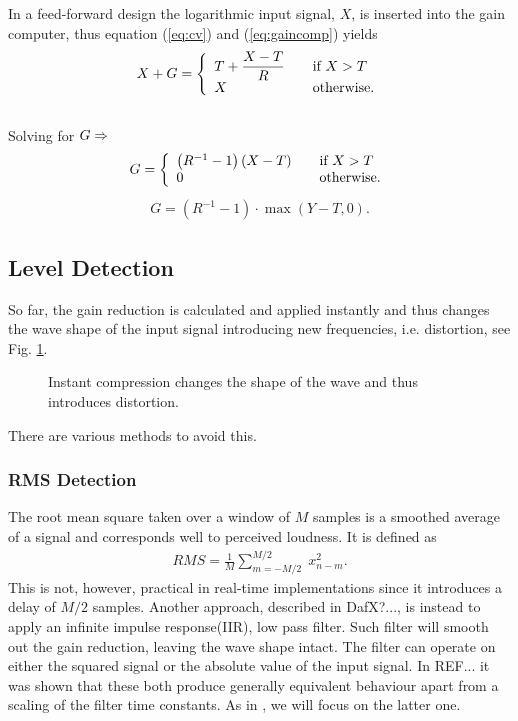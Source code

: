 \documentclass[../main2.tex]{subfiles}
\begin{document}
In a feed-forward design the logarithmic input signal, $X$,  is inserted into the gain computer, thus equation (\ref{eq:cv}) and (\ref{eq:gaincomp}) yields
\begin{equation}
X+G = \left\{ 
  \begin{array}{l l}
    T+ \dfrac{X-T}{R} & \quad \text{if $X > T$}\\
    X & \quad \text{otherwise.}
  \end{array} \right.
\end{equation}
\\Solving for $G \rm \Rightarrow$
\begin{equation} \label{eq:c}
G = \left\{ 
  \begin{array}{l l}
    \left(R^{-1}-1\right)(X-T)& \quad \text{if $X > T$}\\
    0 & \quad \text{otherwise.}
  \end{array} \right.
\end{equation}
\begin{align}
G = (R^{-1}-1)\cdot \max\left(Y-T,0\right).
\end{align}

\subsection{Level Detection}
So far, the gain reduction is calculated and applied instantly and thus changes the wave shape of the input signal introducing new frequencies, i.e. distortion, see Fig. \ref{fig:instant_comp}. 
\begin{figure}[ht]
\centering

\caption{Instant compression changes the shape of the wave and thus introduces distortion.} 
\label{fig:instant_comp}
\end{figure}
There are various methods to avoid this.
\subsubsection{RMS Detection}
The root mean square taken over a window of $M$ samples is a smoothed average of a signal and corresponds well to perceived loudness\cite{giannoullis}. It is defined as 
\begin{align}
RMS = \frac{1}{M}\sum_{m=-M/2}^{M/2}\;x_{n-m}^2.
\end{align}
This is not, however, practical in real-time implementations since it introduces a delay of $M/2$ samples. Another approach, described in DafX?...,  is instead to apply an infinite impulse response(IIR), low pass filter. Such filter will smooth out the gain reduction, leaving the wave shape intact. The filter can operate on either the squared signal or the absolute value of the input signal.  In REF... it was shown that these both produce generally equivalent behaviour apart from a scaling of the filter time constants. As in \cite{gianoullis}, we will focus on the latter one.  
\end{document}
